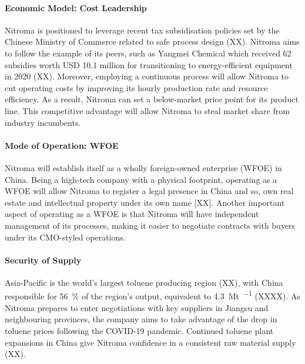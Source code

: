 \paragraph{Economic Model: Cost Leadership}
Nitroma is positioned to leverage recent tax subsidisation policies set by the Chinese Ministry of Commerce related to safe process design (XX). Nitroma aims to follow the example of its peers, such as Yangmei Chemical which received 62 subsidies worth USD 10.1 million for transitioning to energy-efficient equipment in 2020 (XX). Moreover, employing a continuous process will allow Nitroma to cut operating costs by improving its hourly production rate and resource efficiency. As a result, Nitroma can set a below-market price point for its product line. This competitive advantage will allow Nitroma to steal market share from industry incumbents. 

\paragraph{Mode of Operation: WFOE}
Nitroma will establish itself as a wholly foreign-owned enterprise (WFOE) in China. Being a high-tech company with a physical footprint, operating as a WFOE will allow Nitroma to register a legal presence in China and so, own real estate and intellectual property under its own name [XX]. Another important aspect of operating as a WFOE is that Nitroma will have independent management of its processes, making it easier to negotiate contracts with buyers under its CMO-styled operations.


\paragraph{Security of Supply}
Asia-Pacific is the world's largest toluene producing region (XX), with China responsible for \SI{56}{\percent} of the region’s output, equivalent to \SI{4.3}{\mega\tonne\per\year} (XXXX). As Nitroma prepares to enter negotiations with key suppliers in Jiangsu and neighbouring provinces, the company aims to take advantage of the drop in toluene prices following the COVID-19 pandemic. Continued toluene plant expansions in China give Nitroma confidence in a consistent raw material supply (XX).

